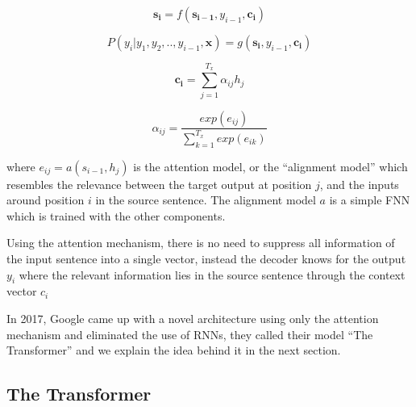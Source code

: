 \begin{equation}
\label{eq:16}
\mathbf{s_i} = f(\mathbf{s_{i-1}}, y_{i-1}, \mathbf{c_i})
\end{equation}

\begin{equation}
\label{eq:17}
P(y_i | y_1, y_2,.., y_{i-1}, \mathbf{x}) = g(\mathbf{s_{i}}, y_{i-1}, \mathbf{c_i})
\end{equation}

\begin{equation}
\label{eq:18}
\mathbf{c_i} = \sum_{j=1}^{T_x} \alpha_{ij} h_j
\end{equation}

\begin{equation}
\label{eq:19}
\alpha_{ij} = \frac{ exp(e_{ij}) }{ \sum_{k=1}^{T_x} exp(e_{ik}) }
\end{equation}

where $e_{ij} = a(s_{i-1}, h_j)$ is the attention model, or the \enquote{alignment model} which resembles the relevance between the target output at position $j$, and the inputs around position $i$ in the source sentence. The alignment model $a$ is a simple \ac{FNN} which is trained with the other components.

Using the attention mechanism, there is no need to suppress all information of the input sentence into a single vector, instead the decoder knows for the output $y_i$ where the relevant information lies in the source sentence through the context vector $c_i$






In 2017, Google came up with a novel architecture using only the attention mechanism and eliminated the use of \ac{RNN}s, they called their model \enquote{The Transformer} \cite{vaswani2017attention} and we explain the idea behind it in the next section.

\subsection{The Transformer} 
\label{bg:sub12}

